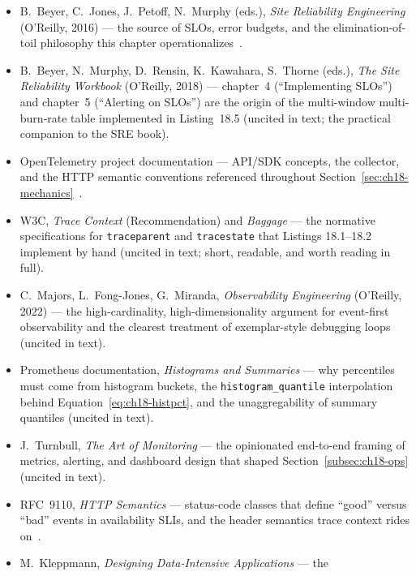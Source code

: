 \begin{itemize}
  \item B.~Beyer, C.~Jones, J.~Petoff, N.~Murphy (eds.), \emph{Site
        Reliability Engineering} (O'Reilly, 2016) --- the source of SLOs,
        error budgets, and the elimination-of-toil philosophy this chapter
        operationalizes~\cite{beyer2016sre}.
  \item B.~Beyer, N.~Murphy, D.~Rensin, K.~Kawahara, S.~Thorne (eds.),
        \emph{The Site Reliability Workbook} (O'Reilly, 2018) --- chapter~4
        (``Implementing SLOs'') and chapter~5 (``Alerting on SLOs'') are
        the origin of the multi-window multi-burn-rate table implemented in
        Listing~18.5 (uncited in text; the practical companion to the SRE
        book).
  \item OpenTelemetry project documentation --- API/SDK concepts, the
        collector, and the HTTP semantic conventions referenced throughout
        Section~\ref{sec:ch18-mechanics}~\cite{opentelemetrydocs}.
  \item W3C, \emph{Trace Context} (Recommendation) and \emph{Baggage} ---
        the normative specifications for \texttt{traceparent} and
        \texttt{tracestate} that Listings 18.1--18.2 implement by hand
        (uncited in text; short, readable, and worth reading in full).
  \item C.~Majors, L.~Fong-Jones, G.~Miranda, \emph{Observability
        Engineering} (O'Reilly, 2022) --- the high-cardinality,
        high-dimensionality argument for event-first observability and the
        clearest treatment of exemplar-style debugging loops (uncited in
        text).
  \item Prometheus documentation, \emph{Histograms and Summaries} --- why
        percentiles must come from histogram buckets, the
        \texttt{histogram\_quantile} interpolation behind
        Equation~\eqref{eq:ch18-histpct}, and the unaggregability of
        summary quantiles (uncited in text).
  \item J.~Turnbull, \emph{The Art of Monitoring} --- the opinionated
        end-to-end framing of metrics, alerting, and dashboard design that
        shaped Section~\ref{subsec:ch18-ops} (uncited in text).
  \item RFC~9110, \emph{HTTP Semantics} --- status-code classes that define
        ``good'' versus ``bad'' events in availability SLIs, and the header
        semantics trace context rides on~\cite{rfc9110}.
  \item M.~Kleppmann, \emph{Designing Data-Intensive Applications} --- the

\end{itemize}
